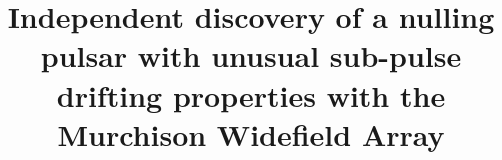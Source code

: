\documentclass[twocolumn]{aastex631}
\begin{document}
\title{Independent discovery of a nulling pulsar with unusual sub-pulse
drifting properties with the Murchison Widefield Array}


\end{document}

